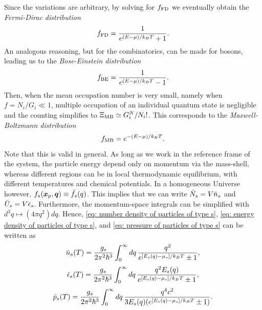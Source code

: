 Since the variations are arbitrary, by solving for $f_{\mathrm{FD}}$ we eventually obtain the \emph{Fermi-Dirac distribution}
\begin{equation}
\label{eq: Fermi-Dirac distribution}
    f_{\mathrm{FD}} = \frac{1}{e^{(E - \mu)/k_BT} + 1}.
\end{equation}
An analogous reasoning, but for the combinatorics, can be made for bosons, leading us to the \emph{Bose-Einstein distribution}
\begin{equation}
\label{eq: Bose-Einstein distribution}
    f_{\mathrm{BE}} = \frac{1}{e^{(E - \mu)/k_BT} - 1}.
\end{equation}
Then, when the mean occupation number is very small, namely when $f = N_i/G_i \ll 1$, multiple occupation of an individual quantum state is negligible and the counting simplifies to $\Xi_{\mathrm{MB}} \simeq G_i^N/N_i!$. This corresponds to the \emph{Maxwell-Boltzmann distribution}
\begin{equation}
\label{eq: Maxwell-Boltzmann distribution}
    f_{\mathrm{MB}} = e^{-(E - \mu)/k_BT}.
\end{equation}
Note that this is valid in general. As long as we work in the reference frame of the system, the
particle energy depend only on momentum via the mass-shell, whereas different regions
can be in local thermodynamic equilibrium, with different temperatures and chemical potentials. In a homogeneous Universe however, $f_s(\bm{x}_p,\bm{q}) \equiv \bar{f}_s(q)$. This implies that we can write $\bar{N}_s = V\bar{n}_s$ and $\bar{U}_s = V\bar{\epsilon}_s$. Furthermore, the momentum-space integrals can be simplified with $d^3q \mapsto (4\pi q^2)dq$. Hence, \eqref{eq: number density of particles of type s}, \eqref{eq: energy density of particles of type s}, and \eqref{eq: pressure of particles of type s} can be written as 
\begin{equation}
\label{eq: number density of particles of type s (HU)}
    \bar{n}_s(T) = \frac{g_s}{2\pi^2\hbar^3}\int_0^\infty dq\,\frac{q^2}{e^{[E_s(q) - \mu_s]/k_BT} \pm 1},
\end{equation}
\begin{equation}
\label{eq: energy density of particles of type s (HU)}
    \bar{\epsilon}_s(T) = \frac{g_s}{2\pi^2\hbar^3}\int_0^\infty dq\,\frac{q^2E_s(q)}{e^{[E_s(q) - \mu_s]/k_BT} \pm 1},
\end{equation}
\begin{equation}
\label{eq: pressure of particles of type s (HU)}
    \bar{p}_s(T) = \frac{g_s}{2\pi^2\hbar^3}\int_0^\infty dq\,\frac{q^4c^2}{3E_s(q)(e^{[E_s(q) - \mu_s]/k_BT} \pm 1)}.
\end{equation}
